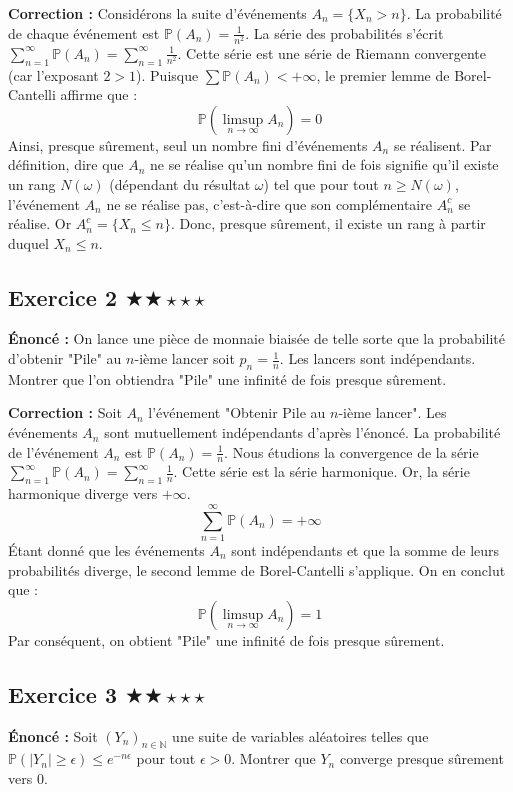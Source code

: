\documentclass[11pt,a4paper]{article}
\begin{document}
\textbf{Correction :}
Considérons la suite d'événements $A_n = \{X_n > n\}$.
La probabilité de chaque événement est $\mathbb{P}(A_n) = \frac{1}{n^2}$.
La série des probabilités s'écrit $\sum_{n=1}^\infty \mathbb{P}(A_n) = \sum_{n=1}^\infty \frac{1}{n^2}$.
Cette série est une série de Riemann convergente (car l'exposant $2 > 1$).
Puisque $\sum \mathbb{P}(A_n) < +\infty$, le premier lemme de Borel-Cantelli affirme que :
$$ \mathbb{P}(\limsup_{n \to \infty} A_n) = 0 $$
Ainsi, presque sûrement, seul un nombre fini d'événements $A_n$ se réalisent.
Par définition, dire que $A_n$ ne se réalise qu'un nombre fini de fois signifie qu'il existe un rang $N(\omega)$ (dépendant du résultat $\omega$) tel que pour tout $n \ge N(\omega)$, l'événement $A_n$ ne se réalise pas, c'est-à-dire que son complémentaire $A_n^c$ se réalise.
Or $A_n^c = \{X_n \le n\}$.
Donc, presque sûrement, il existe un rang à partir duquel $X_n \le n$.


\subsection*{Exercice 2 \quad $\bigstar\bigstar\star\star\star$}


\textbf{Énoncé :}
On lance une pièce de monnaie biaisée de telle sorte que la probabilité d'obtenir "Pile" au $n$-ième lancer soit $p_n = \frac{1}{n}$. Les lancers sont indépendants.
Montrer que l'on obtiendra "Pile" une infinité de fois presque sûrement.

\textbf{Correction :}
Soit $A_n$ l'événement "Obtenir Pile au $n$-ième lancer".
Les événements $A_n$ sont mutuellement indépendants d'après l'énoncé.
La probabilité de l'événement $A_n$ est $\mathbb{P}(A_n) = \frac{1}{n}$.
Nous étudions la convergence de la série $\sum_{n=1}^\infty \mathbb{P}(A_n) = \sum_{n=1}^\infty \frac{1}{n}$.
Cette série est la série harmonique. Or, la série harmonique diverge vers $+\infty$.
$$ \sum_{n=1}^\infty \mathbb{P}(A_n) = +\infty $$
Étant donné que les événements $A_n$ sont indépendants et que la somme de leurs probabilités diverge, le second lemme de Borel-Cantelli s'applique.
On en conclut que :
$$ \mathbb{P}(\limsup_{n \to \infty} A_n) = 1 $$
Par conséquent, on obtient "Pile" une infinité de fois presque sûrement.


\subsection*{Exercice 3 \quad $\bigstar\bigstar\star\star\star$}


\textbf{Énoncé :}
Soit $(Y_n)_{n \in \mathbb{N}}$ une suite de variables aléatoires telles que $\mathbb{P}(|Y_n| \ge \epsilon) \le e^{-n\epsilon}$ pour tout $\epsilon > 0$.
Montrer que $Y_n$ converge presque sûrement vers 0.
\end{document}
